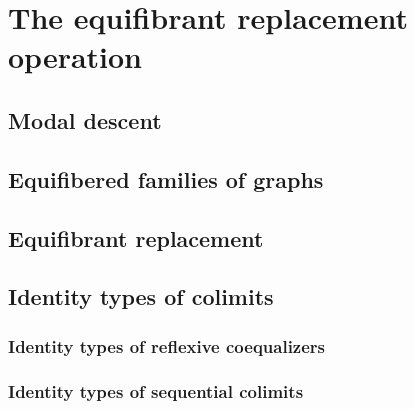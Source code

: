 \chapter{The equifibrant replacement operation}

\section{Modal descent}

\section{Equifibered families of graphs}

\section{Equifibrant replacement}

\section{Identity types of colimits}
\subsection{Identity types of reflexive coequalizers}

\subsection{Identity types of sequential colimits}
